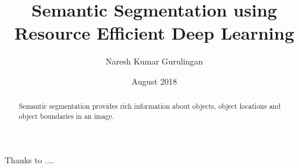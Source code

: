 \documentclass[rnd]{mas_report}
\author{Naresh Kumar Gurulingan}
\title{Semantic Segmentation using Resource Efficient Deep Learning}
\date{August 2018}
\begin{document}
\begin{titlepage}
    \maketitle
\end{titlepage}


\pagestyle{plain}


\cleardoublepage
\statementpage

\begin{abstract}
Semantic segmentation provides rich information about objects, object locations and object boundaries in an image. 
\end{abstract}


\begin{acknowledgements}
Thanks to ....
\end{acknowledgements}


\tableofcontents


\mainmatter %

\pagestyle{mainmatter}










\begin{appendices}


\end{appendices}

\backmatter

\end{document}
